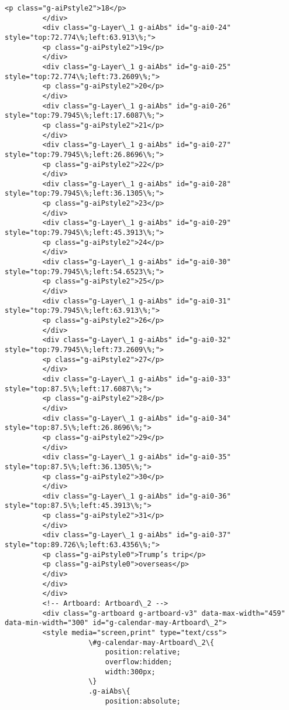\documentclass[11pt]{article}
\begin{document}
\begin{Verbatim}[commandchars=\\\{\}]
         <p class="g-aiPstyle2">18</p>
         </div>
         <div class="g-Layer\_1 g-aiAbs" id="g-ai0-24" style="top:72.774\%;left:63.913\%;">
         <p class="g-aiPstyle2">19</p>
         </div>
         <div class="g-Layer\_1 g-aiAbs" id="g-ai0-25" style="top:72.774\%;left:73.2609\%;">
         <p class="g-aiPstyle2">20</p>
         </div>
         <div class="g-Layer\_1 g-aiAbs" id="g-ai0-26" style="top:79.7945\%;left:17.6087\%;">
         <p class="g-aiPstyle2">21</p>
         </div>
         <div class="g-Layer\_1 g-aiAbs" id="g-ai0-27" style="top:79.7945\%;left:26.8696\%;">
         <p class="g-aiPstyle2">22</p>
         </div>
         <div class="g-Layer\_1 g-aiAbs" id="g-ai0-28" style="top:79.7945\%;left:36.1305\%;">
         <p class="g-aiPstyle2">23</p>
         </div>
         <div class="g-Layer\_1 g-aiAbs" id="g-ai0-29" style="top:79.7945\%;left:45.3913\%;">
         <p class="g-aiPstyle2">24</p>
         </div>
         <div class="g-Layer\_1 g-aiAbs" id="g-ai0-30" style="top:79.7945\%;left:54.6523\%;">
         <p class="g-aiPstyle2">25</p>
         </div>
         <div class="g-Layer\_1 g-aiAbs" id="g-ai0-31" style="top:79.7945\%;left:63.913\%;">
         <p class="g-aiPstyle2">26</p>
         </div>
         <div class="g-Layer\_1 g-aiAbs" id="g-ai0-32" style="top:79.7945\%;left:73.2609\%;">
         <p class="g-aiPstyle2">27</p>
         </div>
         <div class="g-Layer\_1 g-aiAbs" id="g-ai0-33" style="top:87.5\%;left:17.6087\%;">
         <p class="g-aiPstyle2">28</p>
         </div>
         <div class="g-Layer\_1 g-aiAbs" id="g-ai0-34" style="top:87.5\%;left:26.8696\%;">
         <p class="g-aiPstyle2">29</p>
         </div>
         <div class="g-Layer\_1 g-aiAbs" id="g-ai0-35" style="top:87.5\%;left:36.1305\%;">
         <p class="g-aiPstyle2">30</p>
         </div>
         <div class="g-Layer\_1 g-aiAbs" id="g-ai0-36" style="top:87.5\%;left:45.3913\%;">
         <p class="g-aiPstyle2">31</p>
         </div>
         <div class="g-Layer\_1 g-aiAbs" id="g-ai0-37" style="top:89.726\%;left:63.4356\%;">
         <p class="g-aiPstyle0">Trump’s trip</p>
         <p class="g-aiPstyle0">overseas</p>
         </div>
         </div>
         </div>
         <!-- Artboard: Artboard\_2 -->
         <div class="g-artboard g-artboard-v3" data-max-width="459" data-min-width="300" id="g-calendar-may-Artboard\_2">
         <style media="screen,print" type="text/css">
         			\#g-calendar-may-Artboard\_2\{
         				position:relative;
         				overflow:hidden;
         				width:300px;
         			\}
         			.g-aiAbs\{
         				position:absolute;

\end{Verbatim}
\end{document}
